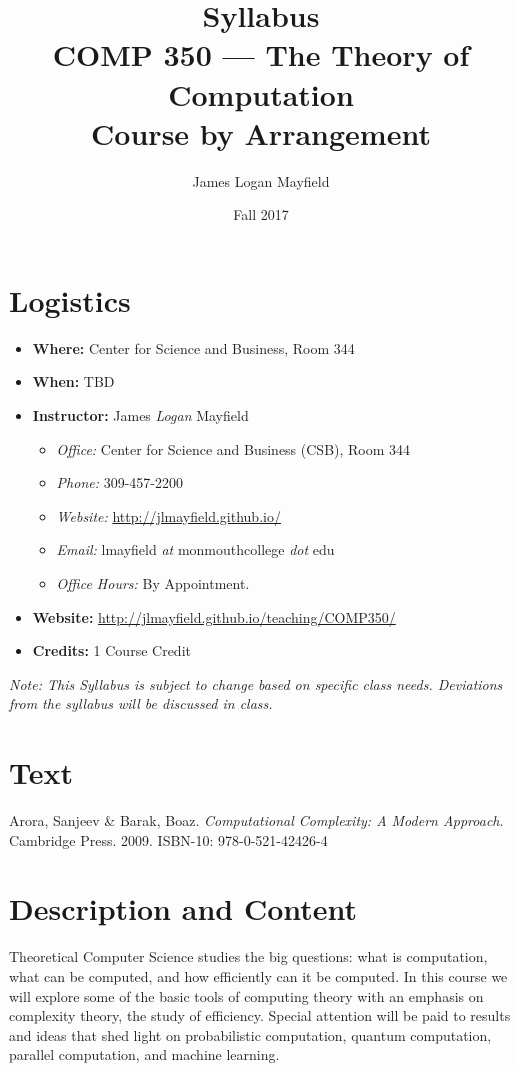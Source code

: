 \documentclass[nobib]{tufte-handout}
\title{Syllabus \\ COMP 350 --- The Theory of Computation \\ \large{Course by Arrangement} }
\author{ James Logan Mayfield }
\date{ Fall 2017 }
\begin{document}
\maketitle

\section{Logistics}
\begin{itemize}
\item \textbf{Where: } Center for Science and Business, Room 344
\item \textbf{When: } TBD
\item \textbf{Instructor: } James \textit{Logan} Mayfield\begin{itemize}
\item \textit{Office: } Center for Science and Business (CSB), Room 344
\item \textit{Phone: } 309-457-2200 %
\item \textit{Website: } \url{http://jlmayfield.github.io/}
\item \textit{Email: } lmayfield \textit{at} monmouthcollege \textit{dot} edu
\item \textit{Office Hours: }  By Appointment.
\end{itemize}
\item \textbf{Website: } \url{http://jlmayfield.github.io/teaching/COMP350/}
\item \textbf{Credits: } 1 Course Credit
\end{itemize}
\emph{Note: This Syllabus is subject to change based on specific class needs. Deviations from the syllabus will be discussed in class.}


\section{Text}

Arora, Sanjeev \& Barak, Boaz. \textit{Computational Complexity: A Modern Approach}. Cambridge Press. 2009. ISBN-10: 978-0-521-42426-4 %


\section{Description and Content}

Theoretical Computer Science studies the big questions: what is computation, what can be computed, and how efficiently can it be computed.  In this course we will explore some of the basic tools of computing theory with an emphasis on complexity theory, the study of efficiency. Special attention will be paid to results and ideas that shed light on probabilistic computation, quantum computation, parallel computation, and machine learning.
\end{document}
